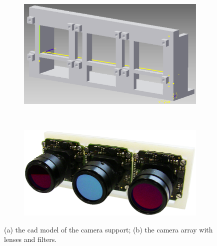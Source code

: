 \documentclass[a4paper, 10pt, conference]{ieeeconf}      %
\begin{document}
\begin{figure}[t]
        \centering
\begin{subfigure}[t]{0.45\textwidth}
        \centering
	     \includegraphics[width=0.9\linewidth]{../images/support_camera_3x1.png}
      	\vspace{-0.2cm}
    		\caption{} 
		\label{fig:Cadmodel}
    \end{subfigure}%
    ~ 
    \begin{subfigure}[t]{0.5\textwidth}
        \centering
      	\includegraphics[width=0.9\linewidth]{../images/IMG_0198.JPG}
      	\vspace{-0.2cm}
      	\caption{}
     		\label{fig:camera}
    \end{subfigure}
    \caption{(a) the cad model of the camera support; (b) the camera array with lenses and filters.}
\end{figure}
   
   
   
\end{document}
